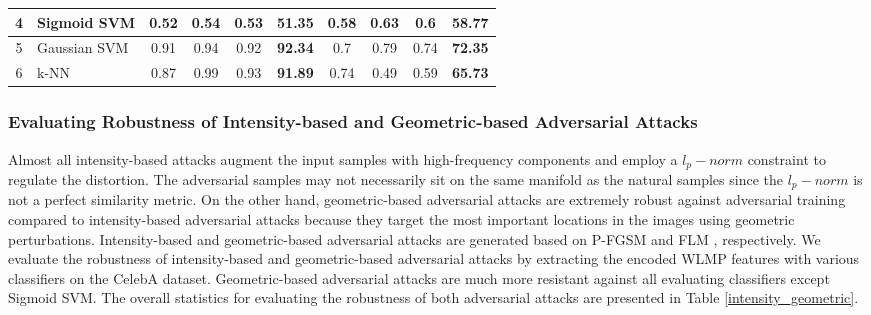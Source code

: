 \documentclass[sn-mathphys]{sn-jnl}%
\theoremstyle{thmstyleone}%
\theoremstyle{thmstyletwo}%
\theoremstyle{thmstylethree}%
\begin{document}
\begin{table*}[t!]
{\begin{tabular}{|c|l|cccc|cccc|}
4                               & Sigmoid SVM                                                & \multicolumn{1}{c|}{0.52}               & \multicolumn{1}{c|}{0.54}            & \multicolumn{1}{c|}{0.53}              & {\color[HTML]{000000} \textbf{51.35}} & \multicolumn{1}{c|}{0.58}               & \multicolumn{1}{c|}{0.63}            & \multicolumn{1}{c|}{0.6}               & {\color[HTML]{000000} \textbf{58.77}} \\ \hline
5                               & Gaussian SVM                                               & \multicolumn{1}{c|}{0.91}               & \multicolumn{1}{c|}{0.94}            & \multicolumn{1}{c|}{0.92}              & {\color[HTML]{000000} \textbf{92.34}} & \multicolumn{1}{c|}{0.7}                & \multicolumn{1}{c|}{0.79}            & \multicolumn{1}{c|}{0.74}              & {\color[HTML]{000000} \textbf{72.35}} \\ \hline
6                               & k-NN                                                       & \multicolumn{1}{c|}{0.87}               & \multicolumn{1}{c|}{0.99}            & \multicolumn{1}{c|}{0.93}              & {\color[HTML]{000000} \textbf{91.89}} & \multicolumn{1}{c|}{0.74}               & \multicolumn{1}{c|}{0.49}            & \multicolumn{1}{c|}{0.59}              & {\color[HTML]{000000} \textbf{65.73}} \\ \hline
\end{tabular}}
\end{table*}

\subsubsection{Evaluating Robustness of Intensity-based and Geometric-based Adversarial Attacks}
Almost all intensity-based attacks augment the input samples with high-frequency components and employ a $l_p-norm$ constraint to regulate the distortion. The adversarial samples may not necessarily sit on the same manifold as the natural samples since the $l_p-norm$ is not a perfect similarity metric. On the other hand, geometric-based adversarial attacks are extremely robust against adversarial training compared to intensity-based adversarial attacks because they target the most important locations in the images using geometric perturbations. Intensity-based and geometric-based adversarial attacks are generated based on P-FGSM \cite{li2019scene} and FLM \cite{dabouei2019fast}, respectively. %
We evaluate the robustness of intensity-based and geometric-based adversarial attacks by extracting the encoded WLMP features with various classifiers on the CelebA dataset. Geometric-based adversarial attacks are much more resistant against all evaluating classifiers except Sigmoid SVM. The overall statistics for evaluating the robustness of both adversarial attacks are presented in Table \ref{intensity_geometric}.
\end{document}

